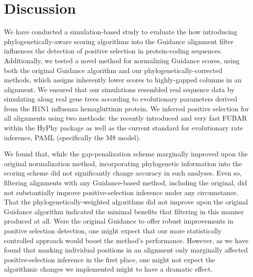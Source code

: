 \documentclass[10pt]{article}
\begin{document}










\section*{Discussion}

We have conducted a simulation-based study to evaluate the how introducing phylogenetically-aware scoring algorithms into the Guidance alignment filter influences the detection of positive selection in protein-coding sequences. Additionally, we tested a novel method for normalizing Guidance scores, using both the original Guidance algorithm and our phylogenetically-corrected methods, which assigns inherently lower scores to highly-gapped columns in an alignment. We ensured that our simulations resembled real sequence data by simulating along real gene trees according to evolutionary parameters derived from the H1N1 influenza hemagluttinin protein. We inferred positive selection for all alignments using two methods: the recently introduced and very fast FUBAR \citep{Murrell2013} within the HyPhy package \citep{Pond2005} as well as the current standard for evolutionary rate inference, PAML \citep{Yang2007} (specifically the M8 model).

We found that, while the gap-penalization scheme marginally improved upon the original normalization method, incorporating phylogenetic information into the scoring scheme did not significantly change accuracy in such analyses. Even so, filtering alignments with any Guidance-based method, including the original, did not substantially improve positive-selection inference under any circumstance. That the phylogenetically-weighted algorithms did not improve upon the original Guidance algorithm indicated the minimal benefits that filtering in this manner produced at all. Were the original Guidance to offer robust improvements in positive selection detection, one might expect that our more statistically controlled approach would boost the method's performance. However, as we have found that masking individual positions in an alignment only marginally affected positive-selection inference in the first place, one might not expect the algorithmic changes we implemented might to have a dramatic effect.
\end{document}
